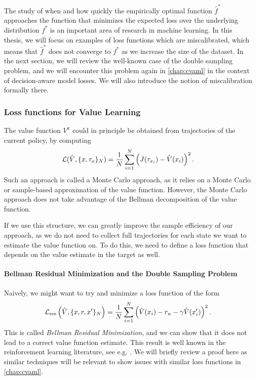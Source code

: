 The study of when and how quickly the empirically optimal function $\hat{f}^*$ approaches the function that minimizes the expected loss over the underlying distribution $f^*$ is an important area of research in machine learning.
In this thesis, we will focus on examples of loss functions which are miscalibrated, which means that $\hat{f}^*$ does not converge to $f^*$ as we increase the size of the dataset.
In the next section, we will review the well-known case of the double sampling problem, and we will encounter this problem again in \autoref{chap:cvaml} in the context of decision-aware model losses.
We will also introduce the notion of miscalibration formally there.

\subsubsection{Loss functions for Value Learning}
The value function $V^\pi$ could in principle be obtained from trajectories of the current policy, by computing $$\mathcal{L}(\hat{V}, \{x, \tau_{x}\}_N) = \frac{1}{N} \sum_{i=1}^N \left(J(\tau_{x_i}) - \hat{V}(x_i)\right)^2.$$
Such an approach is called a Monte Carlo approach, as it relies on a Monte Carlo or sample-based approximation of the value function.
However, the Monte Carlo approach does not take advantage of the Bellman decomposition of the value function.

If we use this structure, we can greatly improve the sample efficiency of our approach, as we do not need to collect full trajectories for each state we want to estimate the value function on.
To do this, we need to define a loss function that depends on the value estimate in the target as well.

\paragraph{Bellman Residual Minimization and the Double Sampling Problem}
Naively, we might want to try and minimize a loss function of the form
$$\mathcal{L}_\mathrm{res}\left(\hat{V}, \{x, r, x'\}_{N}\right) = \frac{1}{N} \sum_{i=1}^N \left(\hat{V}(x_i) - r_n - \gamma \hat{V}(x'_i)\right)^2.$$
This is called \emph{Bellman Residual Minimization}, and we can show that it does not lead to a correct value function estimate.
This result is well known in the reinforcement learning literature, see e.g. \textcite[p. 299]{suttonbook}.
We will briefly review a proof here as similar techniques will be relevant to show issues with similar loss functions in \autoref{chap:cvaml}.


